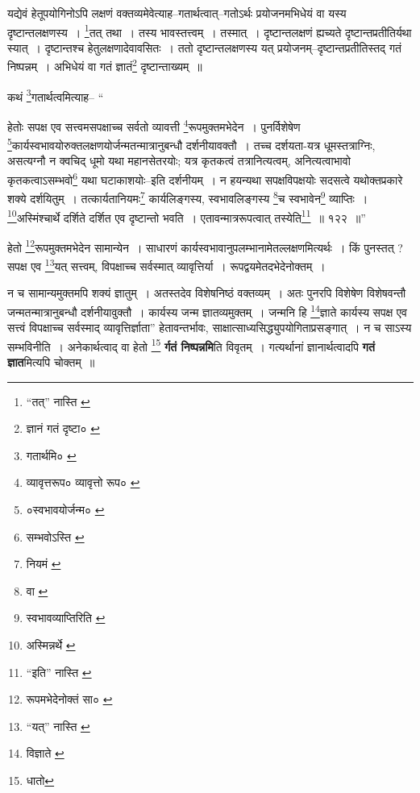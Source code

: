 \documentclass[article,12pt,a4paper]{memoir}
\begin{document}
	यद्येवं हेतूपयोगिनोऽपि लक्षणं वक्तव्यमेवेत्याह--गतार्थत्वात्--गतोऽर्थः प्रयोजनमभिधेयं वा यस्य दृष्टान्तलक्षणस्य । \footnote{“तत्” नास्ति \cite{dp-edE} \cite{dp-edN}}तत् तथा । तस्य भावस्तत्त्वम् । तस्मात् । दृष्टान्तलक्षणं ह्यच्यते दृष्टान्तप्रतीतिर्यथा स्यात् । दृष्टान्तश्च हेतुलक्षणादेवावसितः । ततो दृष्टान्तलक्षणस्य यत् प्रयोजनम्--दृष्टान्तप्रतीतिस्तद् गतं निष्पन्नम् । अभिधेयं वा गतं ज्ञातं\footnote{ज्ञानं \cite{dp-msB} \cite{dp-edP} \cite{dp-edH} \cite{dp-edE} गतं दृष्टा० \cite{dp-msA}} दृष्टान्ताख्यम् ॥ 
	  
	कथं \footnote{गतार्थमि० \cite{dp-edE}}गतार्थत्वमित्याह-- “
	  
	हेतोः सपक्ष एव सत्त्वमसपक्षाच्च सर्वतो व्यावत्ती \footnote{व्यावृत्तरूप० \cite{dp-msB} \cite{dp-edP} व्यावृत्तो रूप० \cite{dp-edH}}रूपमुक्तमभेदेन । पुनर्विशेषेण \footnote{०स्वभावयोर्जन्म० \cite{dp-msB} \cite{dp-msD} \cite{dp-edP} \cite{dp-edH} \cite{dp-edE} \cite{dp-edN}}कार्यस्वभावयोरुक्तलक्षणयोर्जन्मतन्मात्रानुबन्धौ दर्शनीयावक्तौ । तच्च दर्शयता-यत्र धूमस्तत्राग्निः, असत्यग्नौ न क्वचिद् धूमो यथा महानसेतरयोः; यत्र कृतकत्वं तत्रानित्यत्वम्, अनित्यत्वाभावो कृतकत्वाऽसम्भवो\footnote{सम्भवोऽस्ति \cite{dp-msC}} यथा घटाकाशयोः--इति दर्शनीयम् । न हयन्यथा सपक्षविपक्षयोः सदसत्वे यथोक्तप्रकारे शक्ये दर्शयितुम् । तत्कार्यतानियमः\footnote{नियमं \cite{dp-msC}} कार्यलिङ्गस्य, स्वभावलिङ्गस्य \footnote{वा \cite{dp-msC}}च स्वभावेन\footnote{स्वभावव्याप्तिरिति \cite{dp-msC}} व्याप्तिः । \footnote{अस्मिन्नर्थे \cite{dp-msC}}अस्मिंश्चार्थे दर्शिते दर्शित एव दृष्टान्तो भवति । एतावन्मात्ररूपत्वात् तस्येति\footnote{“इति” नास्ति \cite{dp-msC}} ॥ १२२ ॥” 
	  
	हेतो \footnote{रूपमभेदेनोक्तं सा० \cite{dp-msA} \cite{dp-msD} \cite{dp-edP} \cite{dp-edH} \cite{dp-edE}}रूपमुक्तमभेदेन सामान्येन । साधारणं कार्यस्वभावानुपलम्भानामेतल्लक्षणमित्यर्थः । किं पुनस्तत् ? सपक्ष एव \footnote{“यत्” नास्ति \cite{dp-msB} \cite{dp-msC} \cite{dp-msD}}यत् सत्त्वम्, विपक्षाच्च सर्वस्मात् व्यावृत्तिर्या । रूपद्वयमेतदभेदेनोक्तम् । 
	  
	न च सामान्यमुक्तमपि शक्यं ज्ञातुम् । अतस्तदेव विशेषनिष्ठं वक्तव्यम् । अतः पुनरपि विशेषेण विशेषवन्तौ जन्मतन्मात्रानुबन्धौ दर्शनीयावुक्तौ । कार्यस्य जन्म ज्ञातव्यमुक्तम् । जन्मनि हि \footnote{विज्ञाते \cite{dp-msA} \cite{dp-edP} \cite{dp-edH} \cite{dp-edE}}ज्ञाते कार्यस्य सपक्ष एव सत्त्वं विपक्षाच्च सर्वस्माद् व्यावृत्तिर्ज्ञाता” हेतावन्तर्भावः, साक्षात्साध्यसिद्ध्युपयोगिताप्रसङ्गात् । न च साऽस्य सम्भविनीति । अनेकार्थत्वाद् वा हेतो \footnote{धातो} \textbf{र्गतं निष्पन्नमि}ति विवृतम् । गत्यर्थानां ज्ञानार्थत्वादपि \textbf{गतं ज्ञात}मित्यपि चोक्तम् ॥
	\pend
      
\end{document}
